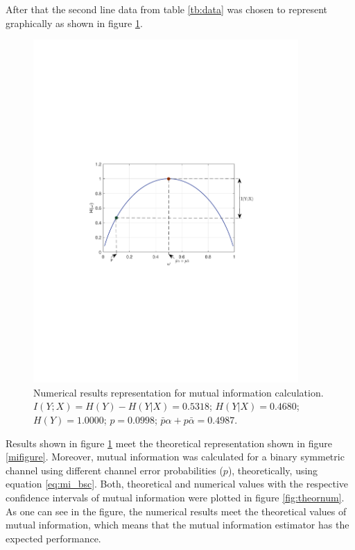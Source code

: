 \begin{refsection}
After that the second line data from table \ref{tb:data} was chosen to represent graphically as shown in figure \ref{fig:datafig}.

\begin{figure}[h]
    \centering
        \includegraphics[clip, trim=1.0cm 9cm 1.0cm 9cm, width=0.90\textwidth]{./sdf/eit_87071_mutual_information_estimator/figures/fig1.pdf}
    \caption{Numerical results representation for mutual information calculation. $I(Y;X) = H(Y) - H(Y|X) = 0.5318$; $H(Y|X) = 0.4680$; $H(Y) = 1.0000$; $p=0.0998$; $\bar{p}\alpha + p \bar{\alpha} = 0.4987$.}\label{fig:datafig}
\end{figure}

Results shown in figure \ref{fig:datafig} meet the theoretical representation shown in figure \ref{mifigure}. Moreover, mutual information was calculated for a binary symmetric channel using different channel error probabilities ($p$), theoretically, using equation \ref{eq:mi_bsc}. Both, theoretical and numerical values with the respective confidence intervals of mutual information were plotted in figure \ref{fig:theornum}. As one can see in the figure, the numerical results meet the theoretical values of mutual information, which means that the mutual information estimator has the expected performance.


\end{refsection}
